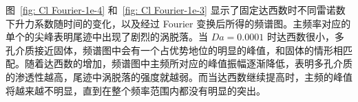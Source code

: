 图~\ref{fig: Cl Fourier-1e-4} 和~\ref{fig: Cl Fourier-1e-3} 显示了固定达西数时不同雷诺数下升力系数随时间的变化，以及经过 Fourier 变换后所得的频谱图。主频率对应的单个的尖峰表明尾迹中出现了剧烈的涡脱落。当 $Da=0.0001$ 时达西数很小，多孔介质接近固体，频谱图中会有一个占优势地位的明显的峰值，和固体的情形相匹配。随着达西数的增加，频谱图中主频所对应的峰值振幅逐渐降低，表明多孔介质的渗透性越高，尾迹中涡脱落的强度就越弱。而当达西数继续提高时，主频的峰值将越来越不明显，直到在整个频率范围内都没有明显的突出。



